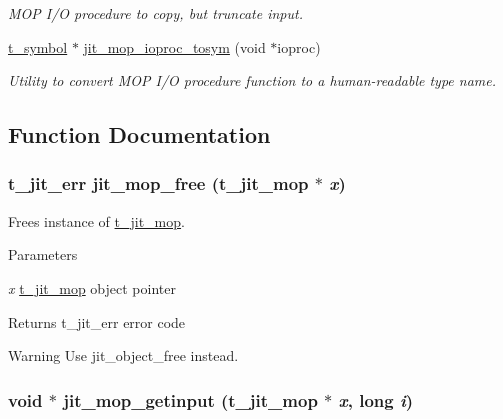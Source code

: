 \begin{DoxyCompactItemize}
\begin{DoxyCompactList}\small\item\em MOP I/O procedure to copy, but truncate input. \item\end{DoxyCompactList}\item 
\hyperlink{structt__symbol}{t\_\-symbol} $\ast$ \hyperlink{group__mopmod_gafa568f8ed923e624872fab658b283995}{jit\_\-mop\_\-ioproc\_\-tosym} (void $\ast$ioproc)
\begin{DoxyCompactList}\small\item\em Utility to convert MOP I/O procedure function to a human-\/readable type name. \item\end{DoxyCompactList}\end{DoxyCompactItemize}


\subsection{Function Documentation}
\hypertarget{group__mopmod_ga3d1628d4dff72d5b10a186027a15c08f}{
\subsubsection[{jit\_\-mop\_\-free}]{\setlength{\rightskip}{0pt plus 5cm}t\_\-jit\_\-err jit\_\-mop\_\-free ({\bf t\_\-jit\_\-mop} $\ast$ {\em x})}}
\label{group__mopmod_ga3d1628d4dff72d5b10a186027a15c08f}


Frees instance of \hyperlink{structt__jit__mop}{t\_\-jit\_\-mop}. 
\begin{DoxyParams}{Parameters}
\item[{\em x}]\hyperlink{structt__jit__mop}{t\_\-jit\_\-mop} object pointer \end{DoxyParams}
\begin{DoxyReturn}{Returns}
t\_\-jit\_\-err error code
\end{DoxyReturn}
\begin{DoxyWarning}{Warning}
Use jit\_\-object\_\-free instead. 
\end{DoxyWarning}
\hypertarget{group__mopmod_ga75decd451d740e633331871410fea0c2}{
\subsubsection[{jit\_\-mop\_\-getinput}]{\setlength{\rightskip}{0pt plus 5cm}void $\ast$ jit\_\-mop\_\-getinput ({\bf t\_\-jit\_\-mop} $\ast$ {\em x}, \/  long {\em i})}}
\label{group__mopmod_ga75decd451d740e633331871410fea0c2}


